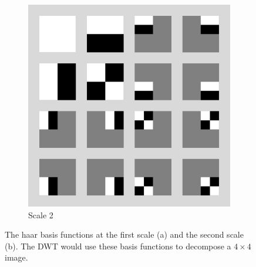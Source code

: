 \begin{figure}
\begin{subfigure}{0.4\textwidth}
  \includegraphics[width=\textwidth]{Chapter3/Images/haar2_scale2.png}
  \caption{Scale 2}
\end{subfigure}
\caption[2-D Haar basis functions]{The haar basis functions at the first scale (a) and the second scale (b). The DWT would use these basis functions to decompose a $4\times 4$ image.}
\label{fig:haar2_basis}
\end{figure}


